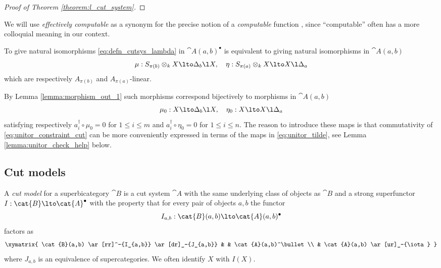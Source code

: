 \begin{proof}[Proof of Theorem \ref{theorem:l_cut_system}]
\end{proof}

We will use \emph{effectively computable} as a synonym for the precise notion of a \emph{computable} function \cite{enderton}, since ``computable'' often has a more colloquial meaning in our context.



\begin{remark} To give natural isomorphisms \eqref{eq:defn_cutsys_lambda} in $\cat{A}(a,b)^\bullet$ is equivalent to giving natural isomorphisms in $\cat{A}(a,b)$
\begin{equation}\label{eq:unitor_tilde_pre}
\mu: S_{\pi(b)} \otimes_k X \lto \Delta_b \l X, \quad \eta: S_{\pi(a)} \otimes_k X \lto X \l \Delta_a
\end{equation}
which are respectively $A_{\pi(b)}$ and $A_{\pi(a)}$-linear. 

By Lemma \ref{lemma:morphism_out_1} such morphisms correspond bijectively to morphisms in $\cat{A}(a,b)$
\begin{equation}\label{eq:unitor_tilde}
\mu_0: X \lto \Delta_b \l X, \quad \eta_0: X \lto X \l \Delta_a
\end{equation}
satisfying respectively $a_i^\dagger \circ \mu_0 = 0$ for $1 \le i \le m$ and $a_i^\dagger \circ \eta_0 = 0$ for $1 \le i \le n$. The reason to introduce these maps is that commutativity of \eqref{eq:unitor_constraint_cut} can be more conveniently expressed in terms of the maps in \eqref{eq:unitor_tilde}, see Lemma \ref{lemma:unitor_check_help} below.
\end{remark}

\subsection{Cut models}\label{section:cut_models}

\begin{definition} A \emph{cut model} for a superbicategory $\cat{B}$ is a cut system $\cat{A}$ with the same underlying class of objects as $\cat{B}$ and a strong superfunctor $I: \cat{B} \lto \cat{A}^\bullet$ with the property that for every pair of objects $a,b$ the functor
\[
I_{a,b}: \cat{B}(a,b) \lto \cat{A}(a,b)^\bullet
\]
factors as
\[
\xymatrix{
\cat{B}(a,b) \ar[rr]^-{I_{a,b}} \ar[dr]_-{J_{a,b}} & & \cat{A}(a,b)^\bullet\\
& \cat{A}(a,b) \ar[ur]_-{\iota}
}
\]
where $J_{a,b}$ is an equivalence of supercategories. We often identify $X$ with $I(X)$.
\end{definition}

